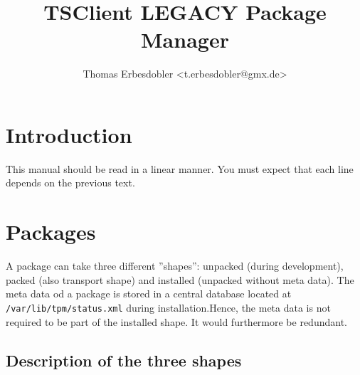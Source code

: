 \documentclass[a4paper]{article}
\title{TSClient LEGACY Package Manager}
\author{Thomas Erbesdobler <t.erbesdobler@gmx.de>}
\newcommand{\file}[1]{\texttt{#1}}
\begin{document}
	\maketitle
	\tableofcontents
	
	\section{Introduction}
	\label{sec:introduction}
	
	This manual should be read in a linear manner. You must expect that each line depends on the previous text.
	
	\section{Packages}
	\label{sec:packages}
	
	A package can take three different ''shapes'': unpacked (during development), packed (also transport shape) and installed (unpacked without meta data). The meta data od a package is stored in a central database located at \file{/var/lib/tpm/status.xml} during installation.Hence, the meta data is not required to be part of the installed shape. It would furthermore be redundant.
	
	\subsection{Description of the three shapes}
	\label{sec:description_of_the_three_shapes}
	
\end{document}
